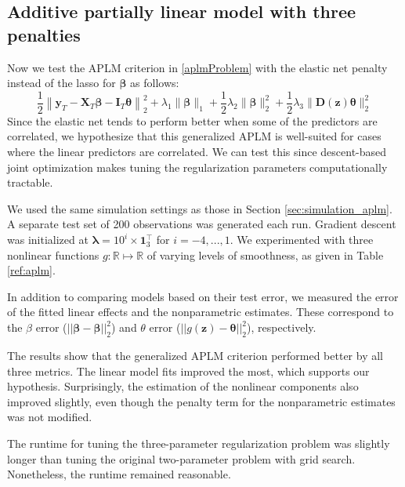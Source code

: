\documentclass{statsoc}
\begin{document}
\subsection{Additive partially linear model with three penalties}
Now we test the APLM criterion in \eqref{aplmProblem} with the elastic net penalty instead of the lasso for $\boldsymbol \beta$ as follows:
\begin{equation}
\frac{1}{2} \left \|
\boldsymbol{y}_T
- \boldsymbol{X}_T\boldsymbol{\beta}
- \boldsymbol{I}_T \boldsymbol{\theta} \right \|^2_2
+ \lambda_1 \| \boldsymbol \beta \|_1
+ \frac{1}{2} \lambda_2 \| \boldsymbol \beta \|_2^2
+ \frac{1}{2} \lambda_3 \| \boldsymbol D(\boldsymbol z) \boldsymbol \theta \|_2^2
\end{equation}
Since the elastic net tends to perform better when some of the predictors are correlated, we hypothesize that this generalized APLM is well-suited for cases where the linear predictors are correlated. We can test this since descent-based joint optimization makes tuning the regularization parameters computationally tractable.

We used the same simulation settings as those in Section \ref{sec:simulation_aplm}. A separate test set of 200 observations was generated each run. Gradient descent was initialized at $\boldsymbol{\lambda} = 10^i \times \boldsymbol 1_3^\top$ for $i=-4, ..., 1$. We experimented with three nonlinear functions $g:\mathbb{R} \mapsto \mathbb{R}$ of varying levels of smoothness, as given in Table \ref{ref:aplm}.

In addition to comparing models based on their test error, we measured the error of the fitted linear effects and the nonparametric estimates. These correspond to the $\beta$ error ($||\boldsymbol \beta - \hat {\boldsymbol \beta}||_2^2$) and $\theta$ error ($|| g(\boldsymbol z) - \boldsymbol \theta ||_2^2$), respectively.

The results show that the generalized APLM criterion performed better by all three metrics. The linear model fits improved the most, which supports our hypothesis. Surprisingly, the estimation of the nonlinear components also improved slightly, even though the penalty term for the nonparametric estimates was not modified.

The runtime for tuning the three-parameter regularization problem was slightly longer than tuning the original two-parameter problem with grid search. Nonetheless, the runtime remained reasonable.
\end{document}

